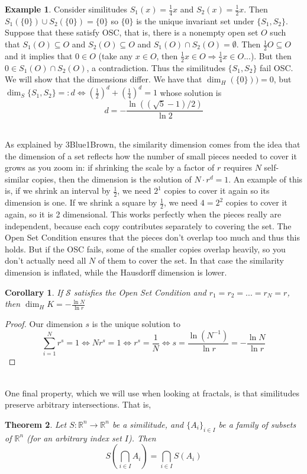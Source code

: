\documentclass{article}
\theoremstyle{plain}
\newtheorem{thm}{Theorem}[section]
\newtheorem{cor}[thm]{Corollary}
\theoremstyle{definition}
\newtheorem*{ex}{Example}
\theoremstyle{remark}
\begin{document}
\begin{ex}
Consider similitudes $S_1(x) = \frac{1}{4}x$ and $S_2(x) = \frac{1}{2}x $. Then $S_1 (\{0\}) \cup S_2 (\{0\}) = \{0\}$ so $\{0\}$ is the unique invariant set under $\{S_1,S_2\}$. Suppose that these satisfy OSC, that is, there is a nonempty open set $O$ such that $S_1(O) \subseteq O$ and $S_2 (O) \subseteq O$ and $S_1 (O) \cap S_2 (O) = \emptyset$. Then $\frac{1}{2} O \subseteq O$ and it implies that $0 \in O$ (take any $x \in O$, then $\frac{1}{2}x \in O \Rightarrow \frac{1}{4}x \in O ... $). But then $0 \in S_1 (O) \cap S_2(O)$, a contradiction. Thus the similitudes $\{S_1, S_2\}$ fail OSC. We will show that the dimensions differ.
We have that $\dim _H (\{0\})) = 0$, but $\dim _S \{S_1,S_2\} =: d \iff \left (\frac{1}{2} \right )^d + \left ( \frac{1}{4}\right )^d = 1$ whose solution is \[
d = -\frac{\ln((\sqrt{5} - 1)/2)}{\ln 2}
\]
\end{ex}
~\\As explained by 3Blue1Brown, the similarity dimension comes from the idea that the dimension of a set reflects how the number of small pieces needed to cover it grows as you zoom in: if shrinking the scale by a factor of $r$ requires $N$ self-similar copies, then the dimension is the solution of $N \cdot r^d = 1$. An example of this is, if we shrink an interval by $\frac{1}{2}$, we need $2^1$ copies to cover it again so its dimension is one. If we shrink a square by $\frac{1}{2}$, we need $4 = 2^2$ copies to cover it again, so it is 2 dimensional. This works perfectly when the pieces really are independent, because each copy contributes separately to covering the set. The Open Set Condition ensures that the pieces don't overlap too much and thus this holds. But if the OSC fails, some of the smaller copies overlap heavily, so you don't actually need all $N$ of them to cover the set. In that case the similarity dimension is inflated, while the Hausdorff dimension is lower.

\newpage
\begin{cor}
    If $\mathcal{S}$ satisfies the Open Set Condition and $r_1=r_2=...=r_N=r$, then $\dim_H K = -\frac{\ln N}{\ln r}$
\end{cor}
\begin{proof}
    Our dimension $s$ is the unique solution to \[
    \sum \limits _{i=1}^N r^s = 1 \iff Nr^s = 1\iff r^s = \frac{1}{N} \iff s = \frac{\ln \left ( N^{-1}\right )}{\ln r} = -\frac{\ln N}{\ln r}
    \]
\end{proof}
~\\
One final property, which we will use when looking at fractals, is that similitudes preserve arbitrary intersections. That is, \begin{thm}\label{thm:pres_sim}
    Let $S: \mathbb{R}^n \to \mathbb{R}^n$ be a similitude, and $\{A_i\}_{i\in I}$ be a family of subsets of $\mathbb{R}^n$ (for an arbitrary index set $I$). Then \[
    S \left ( \bigcap \limits _{i \in I} A_i\right ) = \bigcap \limits _{i \in I} S(A_i)
    \]
\end{thm}
\end{document}
